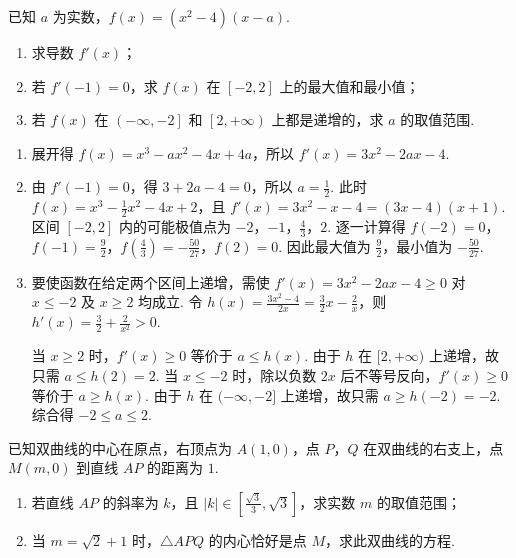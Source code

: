 \begin{problem}
已知 \(a\) 为实数，\(f(x) = (x^{2} - 4)(x - a)\).

\begin{enumerate}
\item 求导数 \(f'(x)\)；
\item 若 \(f'(-1) = 0\)，求 \(f(x)\) 在 \(\left[-2, 2\right]\) 上的最大值和最小值；
\item 若 \(f(x)\) 在 \(\left(-\infty, -2\right]\) 和 \(\left[2, +\infty\right)\) 上都是递增的，求 \(a\) 的取值范围.
\end{enumerate}
\end{problem}

\begin{solution}
\begin{enumerate}
\item 展开得 \(f(x)=x^3-ax^2-4x+4a\)，所以 \(f'(x)=3x^2-2ax-4\).
\item 由 \(f'(-1)=0\)，得 \(3+2a-4=0\)，所以 \(a=\frac{1}{2}\). 此时
\(f(x)=x^3-\frac{1}{2}x^2-4x+2\)，且 \(f'(x)=3x^2-x-4=(3x-4)(x+1)\). 区间 \([-2,2]\) 内的可能极值点为 \(-2\)，\(-1\)，\(\frac{4}{3}\)，\(2\). 逐一计算得
\(f(-2)=0\)，\(f(-1)=\frac{9}{2}\)，\(f\left(\frac{4}{3}\right)=-\frac{50}{27}\)，\(f(2)=0\). 因此最大值为 \(\frac{9}{2}\)，最小值为 \(-\frac{50}{27}\).
\item 要使函数在给定两个区间上递增，需使 \(f'(x)=3x^2-2ax-4\geqslant0\) 对 \(x\leqslant-2\) 及 \(x\geqslant2\) 均成立. 令
\(h(x)=\frac{3x^2-4}{2x}=\frac{3}{2}x-\frac{2}{x}\)，则 \(h'(x)=\frac{3}{2}+\frac{2}{x^2}>0\).

当 \(x\geqslant2\) 时，\(f'(x)\geqslant0\) 等价于 \(a\leqslant h(x)\). 由于 \(h\) 在 \([2,+\infty)\) 上递增，故只需 \(a\leqslant h(2)=2\). 当 \(x\leqslant-2\) 时，除以负数 \(2x\) 后不等号反向，\(f'(x)\geqslant0\) 等价于 \(a\geqslant h(x)\). 由于 \(h\) 在 \((-\infty,-2]\) 上递增，故只需 \(a\geqslant h(-2)=-2\). 综合得 \(-2\leqslant a\leqslant2\).
\end{enumerate}
\end{solution}

\begin{problem}
已知双曲线的中心在原点，右顶点为 \(A(1, 0)\)，点 \(P\)，\(Q\) 在双曲线的右支上，点 \(M(m, 0)\) 到直线 \(AP\) 的距离为 \(1\).

\begin{enumerate}
\item 若直线 \(AP\) 的斜率为 \(k\)，且 \(\left|k\right| \in \left[\frac{\sqrt{3}}{3}, \sqrt{3}\right]\)，求实数 \(m\) 的取值范围；
\item 当 \(m = \sqrt{2} + 1\) 时，\(\triangle APQ\) 的内心恰好是点 \(M\)，求此双曲线的方程.
\end{enumerate}
\end{problem}

